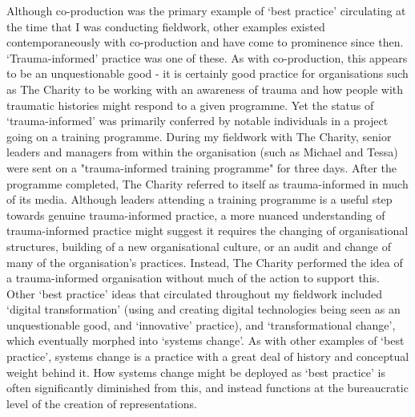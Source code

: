 Although co-production was the primary example of `best practice' circulating at the time that I was conducting fieldwork, other examples existed contemporaneously with co-production and have come to prominence since then. `Trauma-informed' practice was one of these. As with co-production, this appears to be an unquestionable good - it is certainly good practice for organisations such as The Charity to be working with an awareness of trauma and how people with traumatic histories might respond to a given programme. Yet the status of `trauma-informed' was primarily conferred by notable individuals in a project going on a training programme. During my fieldwork with The Charity, senior  leaders and managers from within the organisation (such as Michael and Tessa) were sent on a "trauma-informed training programme" for three days. After the programme completed, The Charity referred to itself as trauma-informed in much of its media. Although leaders attending a training programme is a useful step towards genuine trauma-informed practice, a more nuanced understanding of trauma-informed practice might suggest it requires the changing of organisational structures, building of a new organisational culture, or an audit and change of many of the organisation's practices.  Instead, The Charity performed the idea of a trauma-informed organisation without much of the action to support this. Other `best practice' ideas that circulated throughout my fieldwork included `digital transformation' (using and creating digital technologies being seen as an unquestionable good, and `innovative' practice), and `transformational change', which eventually morphed into `systems change'. As with other examples of `best practice', systems change is a practice with a great deal of history and conceptual weight behind it. How systems change might be deployed as `best practice' is often significantly diminished from this, and instead functions at the bureaucratic level of the creation of representations. 

